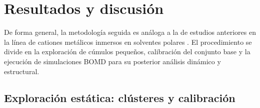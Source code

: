 \chapter{Resultados y discusión}

De forma general, la metodología seguida es análoga a la de estudios anteriores en la línea de cationes metálicos inmersos en solventes polares \cite{CILP-2018-02, CILP-2019-01, CILP-2023-01, CILP-2024-01}. El procedimiento se divide en la exploración de cúmulos pequeños, calibración del conjunto base y la ejecución de simulaciones BOMD para su posterior análisis dinámico y estructural.

\section{Exploración estática: clústeres y calibración}

